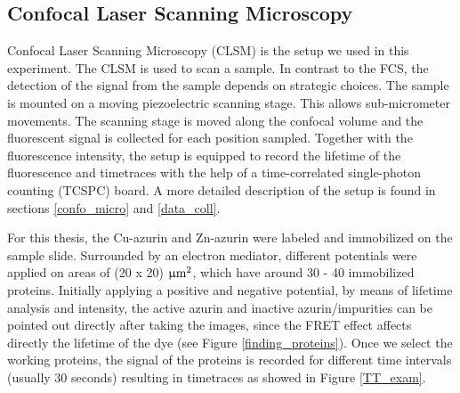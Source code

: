\documentclass[twoside,single]{lion-msc}
\begin{document}
\subsection{Confocal Laser Scanning Microscopy}
Confocal Laser Scanning Microscopy (CLSM) is the setup we used in this experiment. The CLSM is used to scan a sample. In contrast to the FCS, the detection of the signal from the sample depends on strategic choices. The sample is mounted on a moving piezoelectric scanning stage. This allows sub-micrometer movements. The scanning stage is moved along the confocal volume and the fluorescent signal is collected for each position sampled. Together with the fluorescence intensity, the setup is equipped to record the lifetime of the fluorescence and timetraces with the help of a time-correlated single-photon counting (TCSPC) board. A more detailed description of the setup is found in sections \ref{confo_micro} and \ref{data_coll}.

For this thesis, the Cu-azurin and Zn-azurin were labeled and immobilized on the sample slide. Surrounded by an electron mediator, different potentials were applied on areas of (20 x 20) $\upmu \textup{m}^{2}$, which have around 30 - 40 immobilized proteins. Initially applying a positive and negative potential, by means of lifetime analysis and intensity, the active azurin and inactive azurin/impurities can be pointed out directly after taking the images, since the FRET effect affects directly the lifetime of the dye (see Figure \ref{finding_proteins}). Once we select the working proteins, the signal of the proteins is recorded for different time intervals (usually 30 seconds) resulting in timetraces as showed in Figure \ref{TT_exam}.
\end{document}
